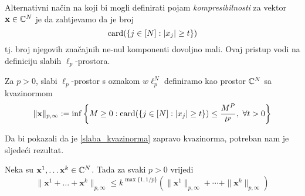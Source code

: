 \documentclass[a4paper,twoside,12pt]{memoir} %
\newcommand{\vect}[1]{\mathbf{#1}}
\newcommand{\card}{\text{\normalfont{card}}}
\begin{document}
\indent Alternativni na\v{c}in na koji bi mogli definirati pojam \textit{kompresibilnosti} za vektor $\vect{x}\in\C^N$ je da zahtjevamo da je broj
$$\card(\{j\in[N]:|x_j|\geq t\})$$
tj. broj njegovih zna\v{c}ajnih ne-nul komponenti dovoljno mali. Ovaj pristup vodi na definiciju slabih $\ell_p$-prostora.
\begin{defn}
Za $p>0$, slabi $\ell_p$-prostor s oznakom $w\ell_p^N$ definiramo kao prostor $\mathbb{C}^N$ sa kvazinormom
\begin{equation}\label{slaba_kvazinorma}
    \|\vect{x}\|_{p, \infty}:=\inf\bigg\{ M \geq 0: \card (\{j\in [N]: |x_j|\geq t \})\leq \frac{M^P}{t^p},\ \forall t>0    \bigg\}
\end{equation}
\end{defn}
\noindent
Da bi pokazali da je \eqref{slaba_kvazinorma} zapravo kvazinorma, potreban nam je sljede\'ci rezultat.
\begin{prop}
    Neka su $\vect{x}^1,\dots\vect{x}^k\in\C^N$. Tada za svaki $p>0$ vrijedi 
    \begin{equation*}
    \|\vect{x}^1+\dots+\vect{x}^k\|_{p,\infty} \leq k^{\max\{1, 1/p\}}(\|\vect{x}^1\|_{p, \infty} + \cdots + \|\vect{x}^k\|_{p, \infty})
    \end{equation*}
\end{prop}
\end{document}
